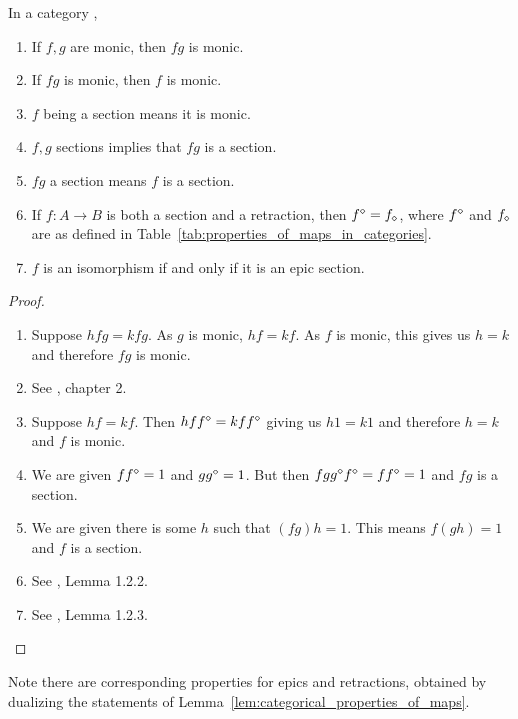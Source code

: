 \begin{lemma}\label{lem:categorical_properties_of_maps}
  In a category \B,
  \begin{enumerate}[{(}i{)}]
    \item If $f,g$ are monic, then $f g$ is monic.
    \item If $f g$ is monic, then $f$ is monic.
    \item $f$ being a section means it is monic.
    \item $f, g$ sections implies that $f g$ is a section.
    \item $f g$ a section means $f$ is a section.
    \item If $f:A \to B$ is both a section and a retraction, then ${f}^\diamond = {f}_\diamond$, where ${f}^\diamond$ and ${f}_\diamond$ are as
      defined in Table~\ref{tab:properties_of_maps_in_categories}.
    \item  $f$ is an isomorphism if and only if it is an epic section.
  \end{enumerate}
\end{lemma}
\begin{proof}
  \prepprooflist
  \begin{enumerate}[{(}i{)}]
    \item Suppose $h f g = k f g$. As $g$ is monic, $h f = k f$. As $f$ is monic, this gives us $h =
      k$ and therefore $f g$ is monic.
    \item See \cite{barr:ctcs}, chapter 2.
    \item Suppose $h f = k f$. Then $h f {f}^\diamond = k f {f}^\diamond$ giving us $h
      1 = k 1$ and therefore $h = k$  and $f$ is monic.
    \item We are given $f{f}^\diamond =1$ and $g{g}^\diamond =1 $. But then $fg
      {g}^\diamond{f}^\diamond = f {f}^\diamond = 1$ and $f g$ is a section.
    \item We are given there is some $h$ such that $(f g) h = 1$. This means $f (gh) =1$ and $f$ is
      a section.
    \item See \cite{cockett2009:ctcs}, Lemma 1.2.2.
    \item See \cite{cockett2009:ctcs}, Lemma 1.2.3.
  \end{enumerate}

\end{proof}

Note there are corresponding properties for epics and retractions, obtained by dualizing the
statements of Lemma~\ref{lem:categorical_properties_of_maps}.

